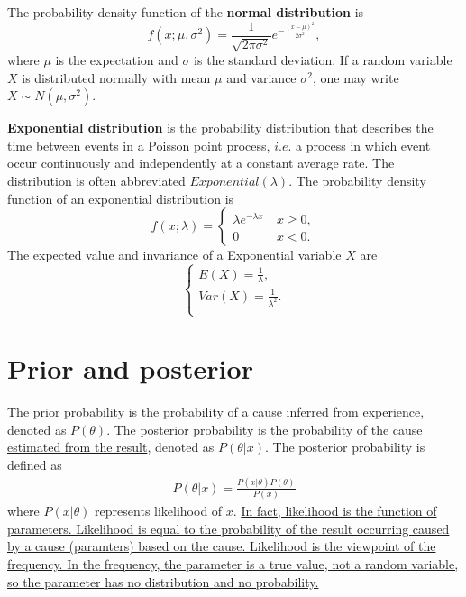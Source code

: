 \documentclass[10pt,onecolumn]{book}
\begin{document}
The probability density function of the \textbf{normal distribution} is
\begin{equation}
f(x; \mu, \sigma^2) = \frac{1}{\sqrt{2 \pi \sigma^2}} e^{-\frac{(x - \mu)^2}{2\sigma^2}},
\end{equation}
where $\mu$ is the expectation and $\sigma$ is the standard deviation. If a random variable $X$ is distributed normally with mean $\mu$ and variance $\sigma^2$, one may write $X \sim N(\mu, \sigma^2)$. {\color{red}{The derivation of the expectation and invariance of normal distribution requires multiple integration operations.}}

\textbf{Exponential distribution} is the probability distribution that describes the time between events in a Poisson point process, $i.e.$ a process in which event occur continuously and independently at a constant average rate. The distribution is often abbreviated $Exponential(\lambda)$. The probability density function of an exponential distribution is 
\begin{equation}
f(x;\lambda)=
\left\{
	\begin{array}{ll}
		\lambda e ^ {- \lambda x} \ & x \ge 0, \\
		0						    & x < 0.
	\end{array}
\right.
\end{equation}
The expected value and invariance of a Exponential variable $X$ are
\begin{equation}
\left\{
	\begin{array}{lr}
	E(X) = \frac{1}{\lambda}, \\
	Var(X) = \frac{1}{\lambda ^ 2}. \\	
	\end{array}
\right.
\end{equation}
{\color{red}{The derivation of the expectation and invariance of exponential distribution requires multiple integration operations.}} 

\section{Prior and posterior}
The prior probability is the probability of \uline{a cause inferred from experience}, denoted as $P(\theta)$. The posterior probability is the probability of \uline{the cause estimated from the result}, denoted as $P(\theta|x)$. The posterior probability is defined as 
\begin{equation}\label{eq:posterior}
\begin{split}
P(\theta|x) = \frac{P(x|\theta) P(\theta)}{P(x)}
\end{split}
\end{equation}
where $P(x|\theta)$ represents likelihood of $x$. \uline{In fact, likelihood is the function of parameters. Likelihood is equal to the probability of the result occurring caused by a cause (paramters) based on the cause. Likelihood is the viewpoint of the frequency. In the frequency, the parameter is a true value, not a random variable, so the parameter has no distribution and no probability.}
\end{document}
